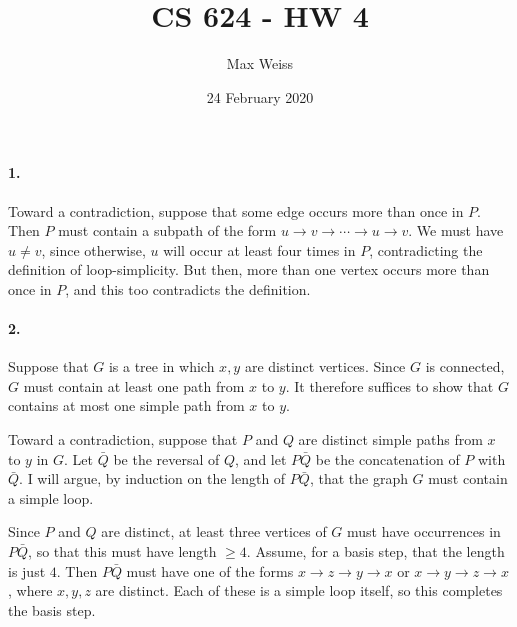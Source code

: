 \documentclass[
]{article}
\date{24 February 2020}
\title{CS 624 - HW 4}
\author{Max Weiss}
\begin{document}
\maketitle




\paragraph{1.} Toward a contradiction, suppose that some edge occurs more than once in $P$.  Then $P$ must contain a subpath of the form  $ u\to v\to\cdots\to u\to v$.  We must have $u\neq v$, since otherwise, $u$ will occur at least four times in $P$, contradicting the definition of loop-simplicity.  But then, more than one vertex occurs more than once in $P$, and this too contradicts the definition.


\paragraph{2.} Suppose that $G$ is a tree in which $x,y$ are distinct vertices.  Since $G$ is connected, $G$ must contain at least one path from $x$ to $y$.  It therefore suffices to show that $G$ contains at most one simple path from $x$ to $y$.  

Toward a contradiction, suppose that $P$ and $Q$ are distinct simple paths from $x$ to $y$ in $G$.  Let $\bar Q$ be the reversal of $Q$, and let $P\bar Q$ be the concatenation of $P$ with $\bar Q$.  I will argue, by induction on the length of $P\bar Q$, that the graph $G$ must contain a simple loop.

Since $P$ and $Q$ are distinct, at least three vertices of $G$ must have occurrences in $P\bar Q$, so that this must have length $\geq 4$.  Assume, for a basis step, that the length is just $4$.  Then  $P\bar Q$ must have one of the forms $x\to z\to y\to x$ or $x\to y\to z\to x$, where $x,y,z$ are distinct.  Each of these is a simple loop itself, so this completes the basis step.
\end{document}

